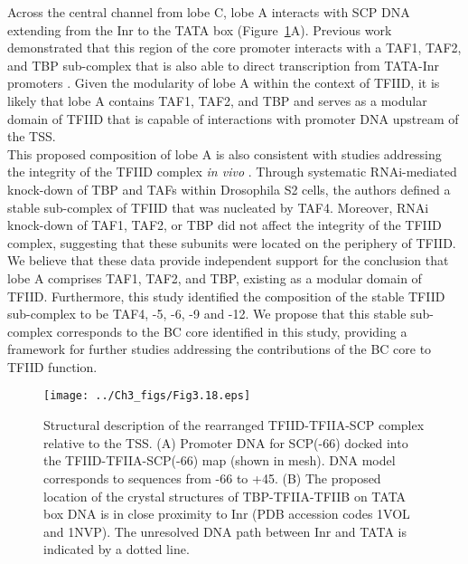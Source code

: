 \indent Across the central channel from lobe C, lobe A interacts with SCP DNA extending from the Inr to the TATA box (Figure~\ref{fig:Fig3.18}A). Previous work demonstrated that this region of the core promoter interacts with a TAF1, TAF2, and TBP sub-complex that is also able to direct transcription from TATA-Inr promoters \cite{Chalkley_2339}. Given the modularity of lobe A within the context of TFIID, it is likely that lobe A contains TAF1, TAF2, and TBP and serves as a modular domain of TFIID that is capable of interactions with promoter DNA upstream of the TSS. \\
\indent This proposed composition of lobe A is also consistent with studies addressing the integrity of the TFIID complex \emph{in vivo} \cite{Wright_1170}.  Through systematic RNAi-mediated knock-down of TBP and TAFs within Drosophila S2 cells, the authors defined a stable sub-complex of TFIID that was nucleated by TAF4.  Moreover, RNAi knock-down of TAF1, TAF2, or TBP did not affect the integrity of the TFIID complex, suggesting that these subunits were located on the periphery of TFIID.  We believe that these data provide independent support for the conclusion that lobe A comprises TAF1, TAF2, and TBP, existing as a modular domain of TFIID.  Furthermore, this study identified the composition of the stable TFIID sub-complex to be TAF4, -5, -6, -9 and -12.  We propose that this stable sub-complex corresponds to the BC core identified in this study, providing a framework for further studies addressing the contributions of the BC core to TFIID function.  \\
\begin{figure}
\centering
\texttt{[image: ../Ch3\_figs/Fig3.18.eps]}
\caption[Structural description of the rearranged TFIID-TFIIA-SCP complex relative to the TSS]{Structural description of the rearranged TFIID-TFIIA-SCP complex relative to the TSS. (A) Promoter DNA for SCP(-66) docked into the TFIID-TFIIA-SCP(-66) map (shown in mesh). DNA model corresponds to sequences from -66 to +45. (B) The proposed location of the crystal structures of TBP-TFIIA-TFIIB on TATA box DNA is in close proximity to Inr (PDB accession codes 1VOL and 1NVP). The unresolved DNA path between Inr and TATA is indicated by a dotted line.}
\label{fig:Fig3.18}
\end{figure}
